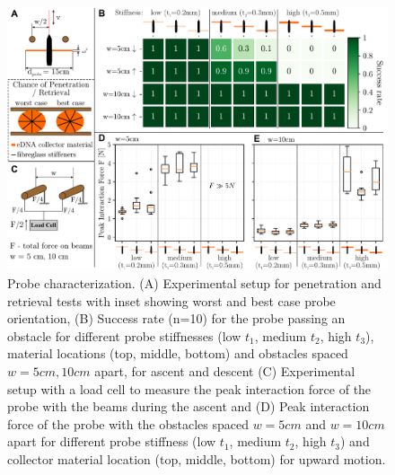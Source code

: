 \begin{figure}[tb]
    \centering
    \includegraphics[width=\linewidth]{chapters/papers/EP/figures/03_eprobe_results_combined.pdf}
    \caption{Probe characterization. (A) Experimental setup for penetration and retrieval tests with inset showing worst and best case probe orientation, (B) Success rate (n=10) for the probe passing an obstacle for different probe stiffnesses (low $t_1$, medium $t_2$, high $t_3$), material locations (top, middle, bottom) and obstacles spaced $w=5cm, 10cm$ apart, for ascent and descent (C) Experimental setup with a load cell to measure the peak interaction force of the probe with the beams during the ascent and (D) Peak interaction force of the probe with the obstacles spaced $w=5cm$ and $w=10cm$ apart for different probe stiffness (low $t_1$, medium $t_2$, high $t_3$) and collector material location (top, middle, bottom) for upward motion.}
    \label{fig:3-probe-results}
\end{figure}

